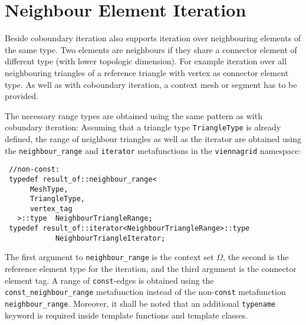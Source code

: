 \section{Neighbour Element Iteration}
Beside coboundary iteration {\ViennaGridversion} also supports iteration over neighbouring elements of the same type. Two elements are neighbours if they share a connector element of different type (with lower topologic dimension). For example iteration over all neighbouring triangles of a reference triangle with vertex as connector element type. As well as with coboundary iteration, a context mesh or segment has to be provided.


The necessary range types are obtained using the same pattern as with cobundary iteration:
Assuming that a triangle type \lstinline|TriangleType| is already defined, the range of neighbour triangles as well as the iterator are obtained
using the \lstinline|neighbour_range| and \lstinline|iterator| metafunctions in the \lstinline|viennagrid| namespace:
\begin{lstlisting}
 //non-const:
 typedef result_of::neighbour_range<
      MeshType,
      TriangleType,
      vertex_tag
   >::type  NeighbourTriangleRange;
 typedef result_of::iterator<NeighbourTriangleRange>::type
            NeighbourTriangleIterator;
\end{lstlisting}
The first argument to \lstinline|neighbour_range| is the context set $\Omega$, the second is the reference element type for the iteration, and the third argument is the connector element tag.
A range of \lstinline|const|-edges is obtained using the \lstinline|const_neighbour_range| metafunction instead of the non-\lstinline|const| metafunction \lstinline|neighbour_range|.
Moreover, it shall be noted that an additional \lstinline|typename| keyword is required inside template functions and template classes.

